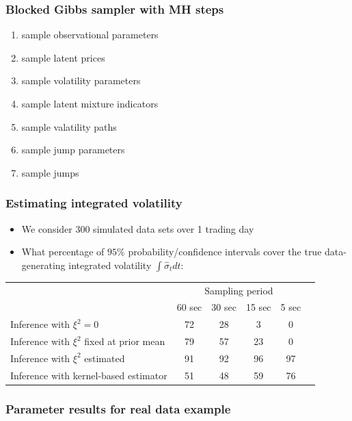 \documentclass{beamer}
\begin{document}
\begin{frame}
  \frametitle{Blocked Gibbs sampler with MH steps}
  \begin{enumerate}
  \item sample observational parameters
  \item sample latent prices
  \item sample volatility parameters
  \item sample latent mixture indicators
  \item sample valatility paths
  \item sample jump parameters
  \item sample jumps
  \end{enumerate}
\end{frame}
\begin{frame}
  \frametitle{Estimating integrated volatility}
  \begin{itemize}
    \item We consider 300 simulated data sets over 1 trading day
  
    \item What percentage of $95\%$ probability/confidence intervals
      cover the true data-generating integrated volatility
      $\int \hat{\sigma}_t dt$:
  \end{itemize}
  \begin{table}[h]
\begin{center}
  \begin{tabular}{|l|ccccc|}
    \hline
    & \multicolumn{4}{c|}{Sampling period} \\
    &   	60 sec 	&   30 sec   &   15 sec & 5 sec  \\ \hline \hline
    Inference with $\xi^2 = 0$   &  72  &   28  &	 3 & 0 \\
    Inference with $\xi^2$ fixed at prior mean &  79 & 57 & 23 & 0 \\
    Inference with $\xi^2$ estimated & 91 & 92 & 96 & 97  \\ \hline
    Inference with kernel-based estimator &  51 & 48 & 59  & 76 \\
    \hline
\end{tabular}
\end{center}
\end{table}
\end{frame}
\begin{frame}
  \frametitle{Parameter results for real data example}
\end{frame}
\end{document}
